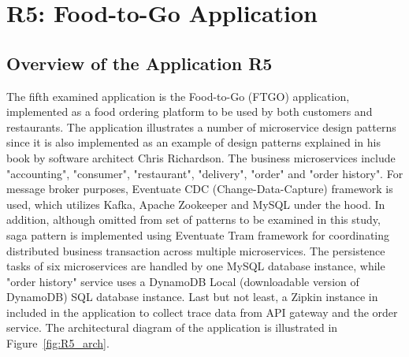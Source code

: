 \documentclass{Configuration_Files/PoliMi3i_thesis}
\begin{document}
\section{R5: Food-to-Go Application}
\label{sec:R5}

\subsection{Overview of the Application R5}
\label{subsec:R5_overview}

The fifth examined application is the Food-to-Go (FTGO) application, implemented as a food ordering platform to be used by both customers and restaurants.
The application illustrates a number of microservice design patterns since it is also implemented as an example of design patterns explained in his book by software architect Chris Richardson\footnotemark[86].
The business microservices include "accounting", "consumer", "restaurant", "delivery", "order" and "order history".
For message broker purposes, Eventuate CDC (Change-Data-Capture)\footnotemark[87] framework is used, which utilizes Kafka, Apache Zookeeper and MySQL under the hood.
In addition, although omitted from set of patterns to be examined in this study, saga pattern is implemented using Eventuate Tram\footnotemark[88] framework for coordinating distributed business transaction across multiple microservices.
The persistence tasks of six microservices are handled by one MySQL database instance, while "order history" service uses a DynamoDB\footnotemark[89] Local (downloadable version of DynamoDB) SQL database instance.
Last but not least, a Zipkin instance in included in the application to collect trace data from API gateway and the order service.
The architectural diagram of the application is illustrated in Figure~\ref{fig:R5_arch}.
\end{document}
